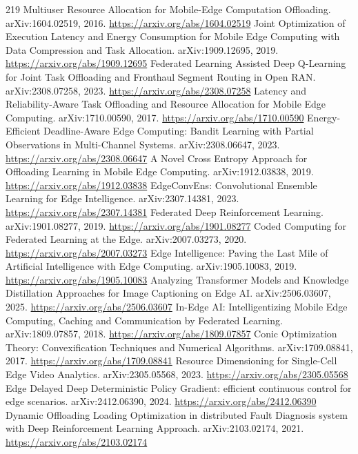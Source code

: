 \documentclass[11pt]{article}
\begin{document}
\begin{thebibliography}{219}
 Multiuser Resource Allocation for Mobile-Edge Computation Offloading. arXiv:1604.02519, 2016. \url{https://arxiv.org/abs/1604.02519}
 Joint Optimization of Execution Latency and Energy Consumption for Mobile Edge Computing with Data Compression and Task Allocation. arXiv:1909.12695, 2019. \url{https://arxiv.org/abs/1909.12695}
 Federated Learning Assisted Deep Q-Learning for Joint Task Offloading and Fronthaul Segment Routing in Open RAN. arXiv:2308.07258, 2023. \url{https://arxiv.org/abs/2308.07258}
 Latency and Reliability-Aware Task Offloading and Resource Allocation for Mobile Edge Computing. arXiv:1710.00590, 2017. \url{https://arxiv.org/abs/1710.00590}
 Energy-Efficient Deadline-Aware Edge Computing: Bandit Learning with Partial Observations in Multi-Channel Systems. arXiv:2308.06647, 2023. \url{https://arxiv.org/abs/2308.06647}
 A Novel Cross Entropy Approach for Offloading Learning in Mobile Edge Computing. arXiv:1912.03838, 2019. \url{https://arxiv.org/abs/1912.03838}
 EdgeConvEns: Convolutional Ensemble Learning for Edge Intelligence. arXiv:2307.14381, 2023. \url{https://arxiv.org/abs/2307.14381}
 Federated Deep Reinforcement Learning. arXiv:1901.08277, 2019. \url{https://arxiv.org/abs/1901.08277}
 Coded Computing for Federated Learning at the Edge. arXiv:2007.03273, 2020. \url{https://arxiv.org/abs/2007.03273}
 Edge Intelligence: Paving the Last Mile of Artificial Intelligence with Edge Computing. arXiv:1905.10083, 2019. \url{https://arxiv.org/abs/1905.10083}
 Analyzing Transformer Models and Knowledge Distillation Approaches for Image Captioning on Edge AI. arXiv:2506.03607, 2025. \url{https://arxiv.org/abs/2506.03607}
 In-Edge AI: Intelligentizing Mobile Edge Computing, Caching and Communication by Federated Learning. arXiv:1809.07857, 2018. \url{https://arxiv.org/abs/1809.07857}
 Conic Optimization Theory: Convexification Techniques and Numerical Algorithms. arXiv:1709.08841, 2017. \url{https://arxiv.org/abs/1709.08841}
 Resource Dimensioning for Single-Cell Edge Video Analytics. arXiv:2305.05568, 2023. \url{https://arxiv.org/abs/2305.05568}
 Edge Delayed Deep Deterministic Policy Gradient: efficient continuous control for edge scenarios. arXiv:2412.06390, 2024. \url{https://arxiv.org/abs/2412.06390}
 Dynamic Offloading Loading Optimization in distributed Fault Diagnosis system with Deep Reinforcement Learning Approach. arXiv:2103.02174, 2021. \url{https://arxiv.org/abs/2103.02174}

\end{thebibliography}
\end{document}
